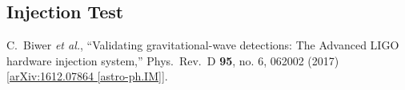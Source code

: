 \documentclass[
10pt, %
english, %
singlespacing, %
nohyperref, %
headsepline, %
]{MastersDoctoralThesis} %
\begin{document}
\appendix %


%
%


\begin{thebibliography}{99}

\section*{Injection Test}

  C.~Biwer {\it et al.},
  ``Validating gravitational-wave detections: The Advanced LIGO hardware injection system,''
  Phys.\ Rev.\ D {\bf 95}, no. 6, 062002 (2017)
  [\href{https://arxiv.org/abs/1612.07864}{arXiv:1612.07864 [astro-ph.IM]}].



\end{thebibliography}

\end{document}
